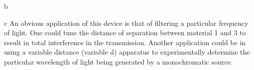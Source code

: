 \begin{homeworkProblem}
\begin{homeworkSection}{b}
\end{homeworkSection}

\begin{homeworkSection}{c}
An obvious application of this device is that of filtering a particular frequency of light. One could tune the distance of separation between material 1 and 3 to result in total interference in the transmission. Another application could be in using a variable distance (variable d) apparatus to experimentally determine the particular wavelength of light being generated by a monochromatic source.
\end{homeworkSection}
\end{homeworkProblem}
